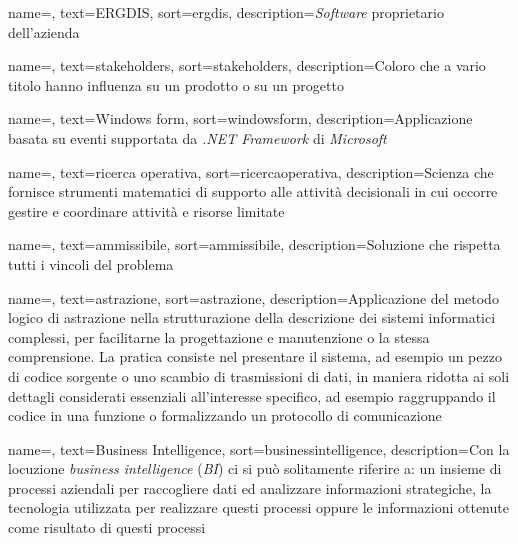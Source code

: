 {
    name=,
    text=ERGDIS,
    sort=ergdis,
    description={\textit{Software} proprietario dell'azienda \textit{\myCompany}}
}

{
    name=,
    text=stakeholders,
    sort=stakeholders,
    description={Coloro che a vario titolo hanno influenza su un
    prodotto o su un progetto}
}

{
    name=,
    text=Windows form,
    sort=windowsform,
    description={Applicazione basata su eventi
    supportata da \textit{.NET Framework} di \textit{Microsoft}}
}

{
    name=,
    text=ricerca operativa,
    sort=ricercaoperativa,
    description={Scienza che fornisce strumenti matematici di
    supporto alle attività decisionali in cui occorre gestire
    e coordinare attività e risorse limitate}
}

{
    name=,
    text=ammissibile,
    sort=ammissibile,
    description={Soluzione che rispetta tutti i vincoli del problema}
}

{
    name=,
    text=astrazione,
    sort=astrazione,
    description={Applicazione del metodo logico di astrazione nella strutturazione della
    descrizione dei sistemi informatici complessi, per facilitarne la progettazione e
    manutenzione o la stessa comprensione. La pratica consiste nel presentare il
    sistema, ad esempio un pezzo di codice sorgente o uno scambio di trasmissioni di
    dati, in maniera ridotta ai soli dettagli considerati essenziali all’interesse specifico,
    ad esempio raggruppando il codice in una funzione o formalizzando un protocollo
    di comunicazione}
}

{
    name=,
    text=Business Intelligence,
    sort=businessintelligence,
    description={Con la locuzione \textit{business intelligence}
    (\textit{BI}) ci si può solitamente riferire a: un insieme di processi aziendali per raccogliere dati ed analizzare
    informazioni strategiche, la tecnologia utilizzata per realizzare questi processi
    oppure le informazioni ottenute come risultato di questi processi}
}

